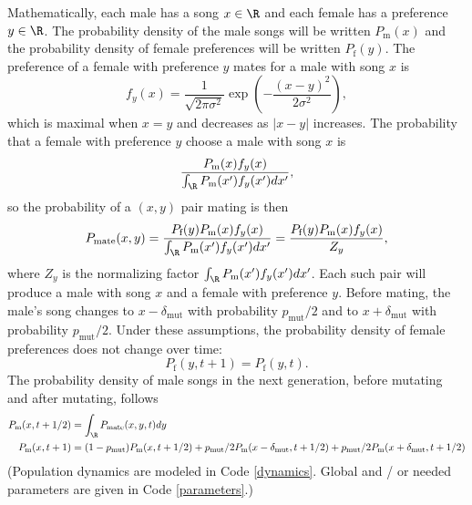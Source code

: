 \documentclass{article}
\begin{document}
Mathematically, each male has a song $x\in \R$ and each female has a preference $y\in\R$. The probability density of the male songs will be written $P_\text{m}(x)$ and the probability density of female preferences will be written $P_\text{f}(y)$. The preference of a female with preference $y$ mates for a male with song $x$ is 
\begin{equation*}
f_y(x)=\frac{1}{\sqrt{2 \pi \sigma^2}}\exp\left(-\frac{(x-y)^2}{2\sigma^2}\right),
\end{equation*}
which is maximal when $x=y$ and decreases as $|x-y|$ increases. The probability that a female with preference $y$ choose a male with song $x$ is 
\begin{equation*}
\frac{P_\text{m}(x)f_y(x)}{\int_\R P_\text{m}(x')f_y(x')dx'},
\end{equation*}
so the probability of a $(x,y)$ pair mating is then
\begin{equation*}
P_\text{mate}(x,y)=\frac{P_\text{f}(y)P_\text{m}(x)f_y(x)}{\int_\R P_\text{m}(x')f_y(x')dx'}=\frac{P_\text{f}(y)P_\text{m}(x)f_y(x)}{Z_y},
\end{equation*}
where $Z_y$ is the normalizing factor $\int_\R P_\text{m}(x')f_y(x')dx'$.
Each such pair will produce a male with song $x$ and a female with preference $y$. Before mating, the male's song changes to $x-\delta_\text{mut}$ with probability $p_\text{mut}/2$ and to $x+\delta_\text{mut}$ with probability $p_\text{mut}/2$. Under these assumptions, the probability density of female preferences does not change over time:
\begin{equation*}
P_\text{f}(y,t+1)=P_\text{f}(y,t).
\end{equation*}
The probability density of male songs in the next generation, before mutating and after mutating, follows
\begin{align*}
P_\text{m}(x,t+1/2)&=\int_\R P_\text{mate}(x,y,t) dy
\\P_\text{m}(x,t+1)&=(1-p_\text{mut})P_\text{m}(x,t+1/2)+p_\text{mut}/2P_\text{m}(x-\delta_\text{mut},t+1/2)+p_\text{mut}/2P_\text{m}(x+\delta_\text{mut},t+1/2)
\end{align*}
 (Population dynamics are modeled in Code \ref{dynamics}. Global and / or needed parameters are given in Code \ref{parameters}.)
\end{document}
